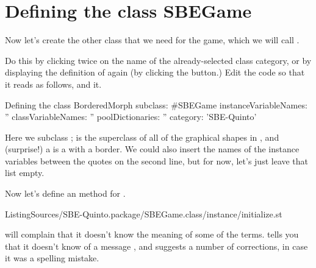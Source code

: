 \documentclass[a4paper,10pt,twoside]{book}
\begin{document}


\section{Defining the class SBEGame}

Now let's create the other class that we need for the game, which we will call .

Do this by clicking twice on the name of the already-selected class category, or by displaying the definition of  again (by clicking the  button.)
Edit the code so that it reads as follows, and  it.

\begin{classdef}[sbegame]{Defining the  class}
BorderedMorph subclass: #SBEGame
   instanceVariableNames: ''
   classVariableNames: ''
   poolDictionaries: ''
   category: 'SBE-Quinto'
\end{classdef}

Here we subclass ;  is the superclass of all of the graphical shapes in \squeak, and (surprise!) a  is a  with a border.  
We could also insert the names of the instance variables between the quotes on the second line, but for now, let's just leave that list empty.

Now let's define an  method for .


%
{ListingSources/SBE-Quinto.package/SBEGame.class/instance/initialize.st}	


\squeak will complain that it doesn't know the meaning of some of the terms.
\squeak tells you that it doesn't know of a message , and suggests a number of corrections, in case it was a spelling mistake.
\end{document}
